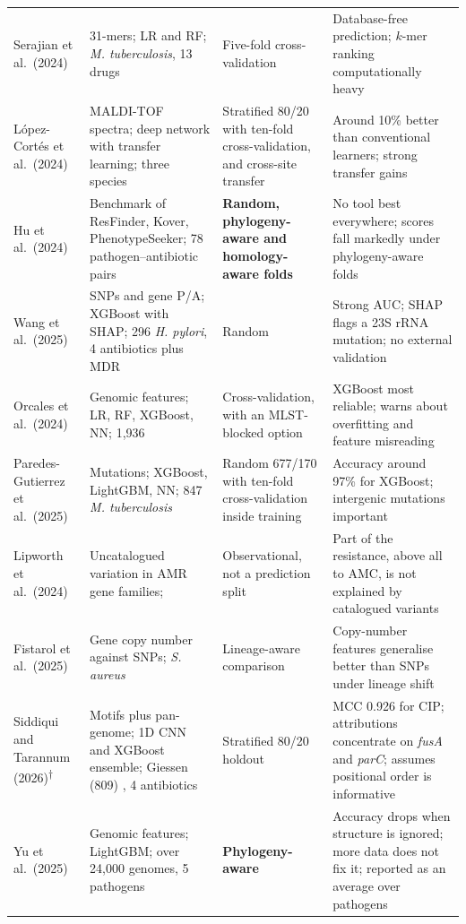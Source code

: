 \begin{table}[t]
\begin{tabularx}{\linewidth}{p{2.4cm}p{4.2cm}p{3.0cm}X}
Serajian et al.\ (2024) \cite{serajian2024mtb} & 31-mers; LR and RF; \textit{M. tuberculosis}, 13 drugs & Five-fold cross-validation & Database-free prediction; $k$-mer ranking computationally heavy \\
L\'opez-Cort\'es et al.\ (2024) \cite{lopezcortes2024msdeepamr} & MALDI-TOF spectra; deep network with transfer learning; three species & Stratified 80/20 with ten-fold cross-validation, and cross-site transfer & Around 10\% better than conventional learners; strong transfer gains \\
Hu et al.\ (2024) \cite{hu2024assessing} & Benchmark of ResFinder, Kover, PhenotypeSeeker; 78 pathogen--antibiotic pairs & \textbf{Random, phylogeny-aware and homology-aware folds} & No tool best everywhere; scores fall markedly under phylogeny-aware folds \\
Wang et al.\ (2025) \cite{wang2025hpylori} & SNPs and gene P/A; XGBoost with SHAP; 296 \textit{H. pylori}, 4 antibiotics plus MDR & Random & Strong AUC; SHAP flags a 23S rRNA mutation; no external validation \\
Orcales et al.\ (2024) \cite{orcales2024tutorial} & Genomic features; LR, RF, XGBoost, NN; 1,936 \Ecoli{} & Cross-validation, with an MLST-blocked option & XGBoost most reliable; warns about overfitting and feature misreading \\
Paredes-Gutierrez et al.\ (2025) \cite{paredes2025mtb} & Mutations; XGBoost, LightGBM, NN; 847 \textit{M. tuberculosis} & Random 677/170 with ten-fold cross-validation inside training & Accuracy around 97\% for XGBoost; intergenic mutations important \\
Lipworth et al.\ (2024) \cite{lipworth2024uncatalogued} & Uncatalogued variation in AMR gene families; \Ecoli{} & Observational, not a prediction split & Part of the resistance, above all to AMC, is not explained by catalogued variants \\
Fistarol et al.\ (2025) \cite{fistarol2025copynumber} & Gene copy number against SNPs; \textit{S. aureus} & Lineage-aware comparison & Copy-number features generalise better than SNPs under lineage shift \\
Siddiqui and Tarannum (2026)\textsuperscript{$\dagger$} \cite{siddiqui2025ensemble} & Motifs plus pan-genome; 1D CNN and XGBoost ensemble; Giessen (809) \Ecoli{}, 4 antibiotics & Stratified 80/20 holdout & MCC 0.926 for CIP; attributions concentrate on \textit{fusA} and \textit{parC}; assumes positional order is informative \\
Yu et al.\ (2025) \cite{yu2025biased} & Genomic features; LightGBM; over 24,000 genomes, 5 pathogens & \textbf{Phylogeny-aware} & Accuracy drops when structure is ignored; more data does not fix it; reported as an average over pathogens \\

\end{tabularx}
\end{table}
